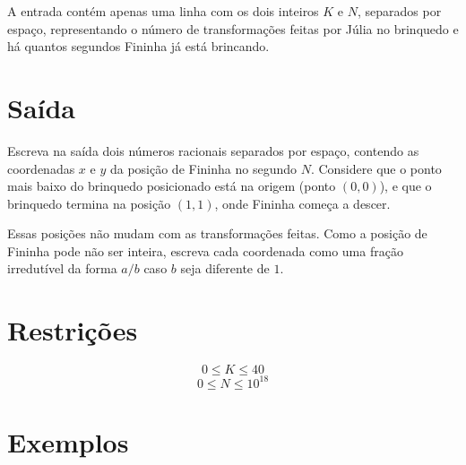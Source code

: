 A entrada contém apenas uma linha com os dois inteiros $K$ e $N$, separados por espaço, representando o número de transformações feitas por Júlia no brinquedo e há quantos segundos Fininha já está brincando.


\section*{Saída}

Escreva na saída dois números racionais separados por espaço, contendo as coordenadas $x$ e $y$ da posição de Fininha no segundo $N$.
 Considere que o ponto mais baixo do brinquedo
posicionado está na origem (ponto $(0, 0)$), e que o brinquedo termina na posição $(1, 1)$, onde Fininha começa a descer.

Essas posições não mudam com as transformações feitas.
 Como a posição de Fininha pode não ser inteira, escreva cada coordenada como uma fração irredutível da forma $a/b$ caso $b$ seja diferente de $1$.


\section*{Restrições}

$$0 \leq K \leq 40$$
$$0 \leq N \leq 10^{18}$$

\section*{Exemplos}
\exemplo
